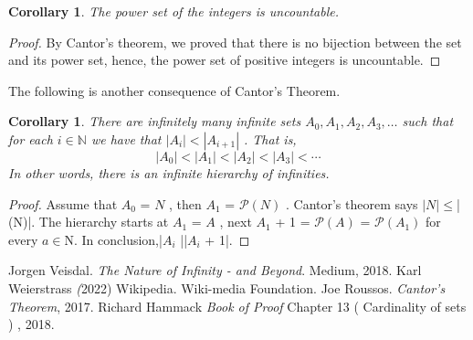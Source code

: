 \documentclass[12pt, a4paper]{article}
\theoremstyle{plain}
\newtheorem{corollary}[theorem]{Corollary}
\begin{document}
\begin{corollary}
The power set of the integers is uncountable.
\end{corollary}

\begin{proof}
By Cantor's theorem, we proved that there is no bijection between the set and its power set, hence, the power set of positive integers is uncountable.   
\end{proof} 

The following is another consequence of Cantor's Theorem.

\begin{corollary}
There are infinitely many infinite sets $A_0, A_1, A_2, A_3, \ldots$ such that for each $i\in \mathbb{N}$ we have that $|A_i|<|A_{i+1}|$ . That is, 
$$|A_0|<|A_1|<|A_2|<|A_3|< \cdots$$
In other words, there is an infinite hierarchy of infinities.
\end{corollary}
\begin{proof}

Assume that  $A_0$ = $N$  , then  $A_1$ = $\mathcal{P}(N)$ . Cantor's theorem says $|N| \leq $|(N)|. The hierarchy starts at $A_1$ = $A$ , next $A_1$ + 1 = $\mathcal{P}(A)$ = $\mathcal{P}(A_1)$ for every $a \in $N$ $. In conclusion,|$A_i$ |\leq |$A_i$ + 1|. 

\end{proof}
\vspace{4cm}

\begin{thebibliography}{9}

Jorgen Veisdal. \textit{The Nature of Infinity - and Beyond}. Medium, 2018.
Karl Weierstrass \textit (2022) Wikipedia. Wiki-media Foundation.
Joe Roussos. \textit{Cantor's Theorem}, 2017. 
Richard Hammack \textit{Book of Proof} Chapter 13 ( Cardinality of sets ) , 2018. 


\end{thebibliography}
\end{document}
